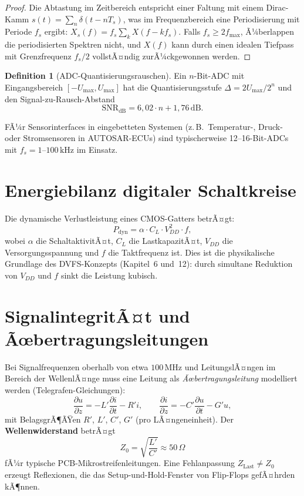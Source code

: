 ﻿\documentclass[a4paper,12pt]{scrreprt}
\theoremstyle{definition}
\newtheorem{definition}{Definition}[chapter]
\begin{document}
	\begin{proof}
		Die Abtastung im Zeitbereich entspricht einer Faltung mit einem Dirac-Kamm
		$s(t) = \sum_n \delta(t - nT_s)$, was im Frequenzbereich eine Periodisierung
		mit Periode $f_s$ ergibt: $X_s(f) = f_s \sum_k X(f - kf_s)$. Falls
		$f_s \geq 2f_{\max}$, Ã¼berlappen die periodisierten Spektren nicht, und
		$X(f)$ kann durch einen idealen Tiefpass mit Grenzfrequenz $f_s/2$
		vollstÃ¤ndig zurÃ¼ckgewonnen werden.
	\end{proof}
	
	\begin{definition}[ADC-Quantisierungsrauschen]
		Ein $n$-Bit-ADC mit Eingangsbereich $[-U_{\max}, U_{\max}]$ hat die
		Quantisierungsstufe $\Delta = 2U_{\max}/2^n$ und den Signal-zu-Rausch-Abstand
		\[
		\mathrm{SNR}_{\mathrm{dB}} = 6{,}02 \cdot n + 1{,}76\,\mathrm{dB}.
		\]
	\end{definition}
	
	FÃ¼r Sensorinterfaces in eingebetteten Systemen (z.\,B.\ Temperatur-, Druck-
	oder Stromsensoren in AUTOSAR-ECUs) sind typischerweise 12--16-Bit-ADCs
	mit $f_s = 1$--$100\,\mathrm{kHz}$ im Einsatz.
	
	\section{Energiebilanz digitaler Schaltkreise}
	
	Die dynamische Verlustleistung eines CMOS-Gatters betrÃ¤gt:
	\[
	P_{\text{dyn}} = \alpha \cdot C_L \cdot V_{DD}^2 \cdot f,
	\]
	wobei $\alpha$ die SchaltaktivitÃ¤t, $C_L$ die LastkapazitÃ¤t, $V_{DD}$
	die Versorgungsspannung und $f$ die Taktfrequenz ist. Dies ist die
	physikalische Grundlage des DVFS-Konzepts (Kapitel~6 und~12): durch
	simultane Reduktion von $V_{DD}$ und $f$ sinkt die Leistung kubisch.

	\section{SignalintegritÃ¤t und Ãœbertragungsleitungen}

	Bei Signalfrequenzen oberhalb von etwa $100\,\text{MHz}$ und LeitungslÃ¤ngen
	im Bereich der WellenlÃ¤nge muss eine Leitung als \emph{Ãœbertragungsleitung}
	modelliert werden (Telegrafen-Gleichungen):
	\[
	\frac{\partial u}{\partial z} = -L'\frac{\partial i}{\partial t} - R' i,
	\qquad
	\frac{\partial i}{\partial z} = -C'\frac{\partial u}{\partial t} - G' u,
	\]
	mit BelagsgrÃ¶ÃŸen $R'$, $L'$, $C'$, $G'$ (pro LÃ¤ngeneinheit).
	Der \textbf{Wellenwiderstand} betrÃ¤gt
	\[
	Z_0 = \sqrt{\frac{L'}{C'}} \approx 50\,\Omega
	\]
	fÃ¼r typische PCB-Mikro\-streifenleitungen. Eine Fehlanpassung
	$Z_{\mathrm{Last}} \neq Z_0$ erzeugt Reflexionen, die das Setup-und-Hold-Fenster
	von Flip-Flops gefÃ¤hrden kÃ¶nnen.
\end{document}
